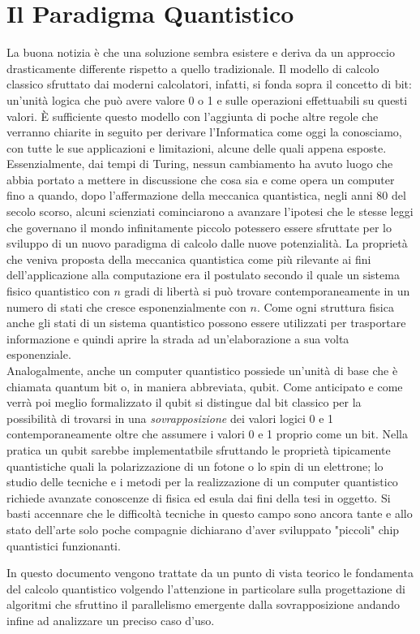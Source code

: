 \documentclass[12pt,a4paper,openright]{report}
\begin{document}
\section{Il Paradigma Quantistico}
La buona notizia è che una soluzione sembra esistere e deriva da un approccio drasticamente differente rispetto a quello tradizionale. Il modello di calcolo classico sfruttato dai moderni calcolatori, infatti,
si fonda sopra il concetto di bit: un'unità logica che può avere valore 0 o 1 e sulle operazioni effettuabili su questi valori. È sufficiente questo modello con l'aggiunta di poche altre regole che verranno
chiarite in seguito per derivare l'Informatica come oggi la conosciamo, con tutte le sue applicazioni e limitazioni, alcune delle quali appena esposte. Essenzialmente, dai tempi di Turing, nessun cambiamento
ha avuto luogo che abbia portato a mettere in discussione che cosa sia e come opera un computer fino a quando, dopo l'affermazione della meccanica quantistica, negli anni 80 del secolo scorso, alcuni scienziati
cominciarono a avanzare l'ipotesi che le stesse leggi che governano il mondo infinitamente piccolo potessero essere sfruttate per lo sviluppo di un nuovo paradigma di calcolo dalle nuove potenzialità.
La proprietà che veniva proposta della meccanica quantistica come più rilevante ai fini dell'applicazione alla computazione era il postulato secondo il quale un sistema fisico quantistico con $n$ gradi di libertà
si può trovare contemporaneamente in un numero di stati che cresce esponenzialmente con $n$. Come ogni struttura fisica anche gli stati di un sistema quantistico possono essere utilizzati per trasportare
informazione e quindi aprire la strada ad un'elaborazione a sua volta esponenziale. \\
Analogalmente, anche un computer quantistico possiede un'unità di base che è chiamata quantum bit o, in maniera abbreviata, qubit. Come anticipato e come verrà poi meglio formalizzato il qubit si distingue dal bit classico
per la possibilità di trovarsi in una \emph{sovrapposizione} dei valori logici 0 e 1 contemporaneamente oltre che assumere i valori 0 e 1 proprio come un bit. Nella pratica un qubit sarebbe implementatbile 
sfruttando le proprietà tipicamente quantistiche quali la polarizzazione di un fotone o lo spin di un elettrone; lo studio delle tecniche e i metodi per la realizzazione di un computer quantistico richiede
avanzate conoscenze di fisica ed esula dai fini della tesi in oggetto. Si basti accennare che le difficoltà tecniche in questo campo sono ancora tante e allo stato dell'arte solo poche compagnie dichiarano
d'aver sviluppato "piccoli" chip quantistici funzionanti\cite{ref24}.\par
In questo documento vengono trattate da un punto di vista teorico le fondamenta del calcolo quantistico volgendo l'attenzione in particolare sulla progettazione di algoritmi che sfruttino il parallelismo 
emergente dalla sovrapposizione andando infine ad analizzare un preciso caso d'uso.  
\end{document}
